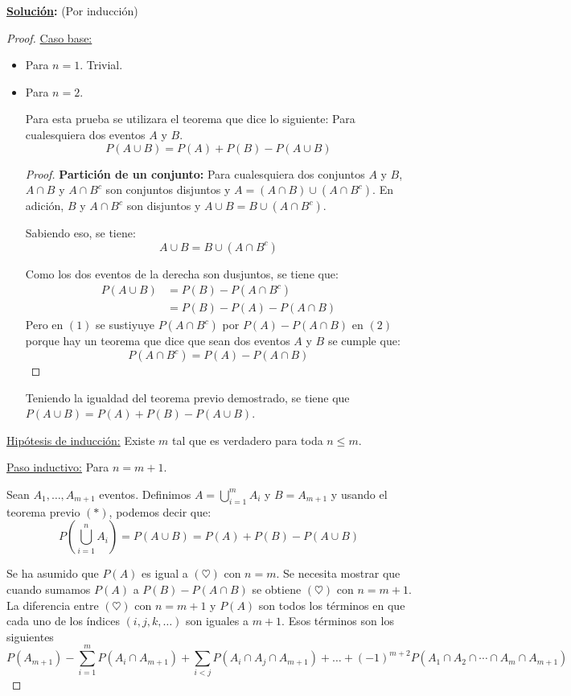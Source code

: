 \documentclass[11pt,letterpaper]{report}
\newcommand{\sol}{\textbf{\underline{Solución}: }} %
\begin{document}
\begin{enumerate}
\sol (Por inducción)
\begin{proof}
\underline{Caso base:}
\begin{itemize}
    \item Para $n=1$. Trivial.
    \item Para $n=2$.
    
    Para esta prueba se utilizara el teorema que dice lo siguiente: Para cualesquiera dos eventos
    $A$ y $B$.
    \[
        P(A \cup B) = P(A) + P(B) - P(A \cup B) \tag{*}
    \]
    \begin{proof}
        \textbf{Partición de un conjunto:} Para cualesquiera dos conjuntos $A$ y $B$, $A \cap B$
        y $A \cap B^c$ son conjuntos disjuntos y $A = (A \cap B) \cup (A \cap B^c)$. En adición,
        $B$ y $A \cap B^c$ son disjuntos y $A \cup B = B \cup (A \cap B^c)$.


        Sabiendo eso, se tiene:
        $$A \cup B = B \cup (A \cap B^c)$$

        Como los dos eventos de la derecha son dusjuntos, se tiene que:
        \begin{align*}
            P(A \cup B) &=  P(B) - P(A \cap B^c) \tag{1}\\
                &= P(B) - P(A) - P(A \cap B) \tag{2}
        \end{align*}
        Pero en $(1)$ se sustiyuye $P(A \cap B^c)$ por $P(A) - P(A \cap B)$ en $(2)$porque hay un
        teorema que dice que sean dos eventos $A$ y $B$ se cumple que:
        $$P(A \cap B^c) = P(A) - P(A \cap B)$$
    \end{proof}
    Teniendo la igualdad del teorema previo demostrado, se tiene que 
    $P(A \cup B) = P(A) + P(B) - P(A \cup B)$.
\end{itemize}

\underline{Hipótesis de inducción:} Existe $m$ tal que es verdadero para toda $n \leq m$.

\underline{Paso inductivo:} Para $n=m+1$.

Sean $A_1, \ldots, A_{m+1}$ eventos. Definimos $A = \bigcup_{i=1}^{m} A_i$ y $B = A_{m+1}$ y usando
el teorema previo $(*)$, podemos decir que:
\begin{equation}
    P(\bigcup_{i=1}^{n} A_i) = P(A \cup B) = P(A) + P(B) - P(A \cup B) \tag{3}
\end{equation}

Se ha asumido que $P(A)$ es igual a $(\heartsuit)$ con $n=m$. Se necesita mostrar que cuando sumamos
$P(A)$ a $P(B) - P(A \cap B)$ se obtiene $(\heartsuit)$ con $n=m+1$. La diferencia entre
$(\heartsuit)$ con $n=m+1$ y $P(A)$ son todos los términos en que cada uno de los índices 
$(i,j,k,\ldots)$ son iguales a $m+1$. Esos términos son los siguientes
\begin{equation}
    P(A_{m+1}) - \sum_{i=1}^{m} P(A_i \cap A_{m+1}) + \sum_{i < j} P(A_i \cap A_j \cap A_{m+1}) +
    \ldots + (-1)^{m+2} P(A_1 \cap A_2 \cap \cdots \cap A_m \cap A_{m+1}) \tag{4}
\end{equation}


\end{proof}
\end{enumerate}
\end{document}
